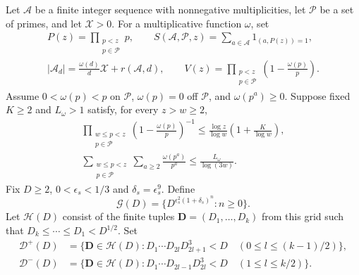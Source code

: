 \begin{fact}\label{fact:structured-sieve}
Let $\mathcal A$ be a finite integer sequence with nonnegative
multiplicities, let $\mathcal P$ be a set of primes, and let $\mathcal X>0$.
For a multiplicative function $\omega$, set
\begin{equation}\label{eq:classical-sieve-data}
 \begin{gathered}
 P(z)=\prod_{\substack{p<z\\p\in\mathcal P}}p,\qquad
 S(\mathcal A,\mathcal P,z)=\sum_{a\in\mathcal A}1_{(a,P(z))=1},\\
 |\mathcal A_d|=\frac{\omega(d)}d\mathcal X+r(\mathcal A,d),\qquad
 V(z)=\prod_{\substack{p<z\\p\in\mathcal P}}
                       \left(1-\frac{\omega(p)}p\right).
 \end{gathered}
\end{equation}
Assume $0<\omega(p)<p$ on $\mathcal P$, $\omega(p)=0$ off $\mathcal P$,
and $\omega(p^a)\ge0$. Suppose fixed $K\ge2$ and $L_\omega>1$ satisfy,
for every $z>w\ge2$,
\begin{equation}\label{eq:classical-density}
 \begin{gathered}
 \prod_{\substack{w\le p<z\\p\in\mathcal P}}
 \left(1-\frac{\omega(p)}p\right)^{-1}
 \le\frac{\log z}{\log w}\left(1+\frac K{\log w}\right),\\
 \sum_{\substack{w\le p<z\\p\in\mathcal P}}
       \sum_{a\ge2}\frac{\omega(p^a)}{p^a}
 \le\frac{L_\omega}{\log(3w)}.
 \end{gathered}
\end{equation}
Fix $D\ge2$, $0<\epsilon_s<1/3$ and $\delta_s=\epsilon_s^9$.
Define
\begin{equation}\label{eq:classical-grid}
 \mathcal G(D)=\{D^{\epsilon_s^2(1+\delta_s)^n}:n\ge0\}.
\end{equation}
Let $\mathcal H(D)$ consist of the finite tuples
$\mathbf D=(D_1,\ldots,D_k)$ from this grid such that
$D_k\le\cdots\le D_1<D^{1/2}$. Set
\begin{equation}\label{eq:classical-tail-tuples}
 \begin{aligned}
 \mathcal D^+(D)&=\{\mathbf D\in\mathcal H(D):
 D_1\cdots D_{2l}D_{2l+1}^{3}<D\quad
             (0\le l\le(k-1)/2)\},\\
 \mathcal D^-(D)&=\{\mathbf D\in\mathcal H(D):
 D_1\cdots D_{2l-1}D_{2l}^{3}<D\quad
             (1\le l\le k/2)\}.
 \end{aligned}

\end{equation}
\end{fact}
